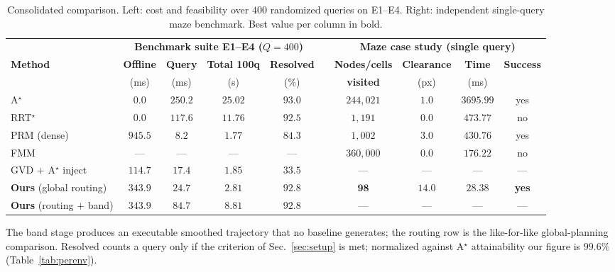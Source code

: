 \documentclass[conference]{IEEEtran}
\begin{document}
\begin{table}[htbp]
\caption{Consolidated comparison. Left: cost and feasibility over $400$ randomized queries on E1--E4. Right: independent single-query maze benchmark. Best value per column in bold.}
\label{tab:master}
\begin{center}
\begin{tabular}{@{}l cccc c cccc@{}}
\toprule
& \multicolumn{4}{c}{\textbf{Benchmark suite E1--E4 ($Q=400$)}} & & \multicolumn{4}{c}{\textbf{Maze case study (single query)}} \\
\cmidrule(lr){2-5} \cmidrule(lr){7-10}
\textbf{Method} & \textbf{Offline} & \textbf{Query} & \textbf{Total 100q} & \textbf{Resolved} & & \textbf{Nodes/cells} & \textbf{Clearance} & \textbf{Time} & \textbf{Success} \\
 & (ms) & (ms) & (s) & (\%) & & \textbf{visited} & (px) & (ms) & \\ \midrule
A$^\star$~\cite{hart1968}              & $\mathbf{0.0}$ & $250.2$ & $25.02$ & $\mathbf{93.0}$ & & $244{,}021$ & $1.0$ & $3695.99$ & yes \\
RRT$^\star$~\cite{karaman2011}         & $\mathbf{0.0}$ & $117.6$ & $11.76$ & $92.5$ & & $1{,}191$ & $0.0$ & $473.77$ & no \\
PRM (dense)~\cite{kavraki1996}         & $945.5$ & $\mathbf{8.2}$ & $1.77$ & $84.3$ & & $1{,}002$ & $3.0$ & $430.76$ & yes \\
FMM                                    & --- & --- & --- & --- & & $360{,}000$ & $0.0$ & $176.22$ & no \\
GVD + A$^\star$ inject                 & $114.7$ & $17.4$ & $1.85$ & $33.5$ & & --- & --- & --- & --- \\ \midrule
\textbf{Ours} (global routing)         & $343.9$ & $24.7$ & $\mathbf{2.81}$ & $92.8$ & & $\mathbf{98}$ & $\mathbf{14.0}$ & $\mathbf{28.38}$ & \textbf{yes} \\
\textbf{Ours} (routing $+$ band)       & $343.9$ & $84.7$ & $8.81$ & $92.8$ & & --- & --- & --- & --- \\ \bottomrule
\end{tabular}
\end{center}
\footnotesize The band stage produces an executable smoothed trajectory that no baseline generates; the routing row is the like-for-like global-planning comparison. Resolved counts a query only if the criterion of Sec.~\ref{sec:setup} is met; normalized against A$^\star$ attainability our figure is $99.6\%$ (Table~\ref{tab:perenv}).
\end{table}
\end{document}
